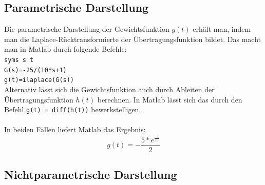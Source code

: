 
\subsection{Parametrische Darstellung} %
Die parametrische Darstellung der Gewichtsfunktion $g(t)$ erhält man, indem man die Laplace-Rücktransformierte der Übertragungsfunktion bildet. Das macht man in Matlab durch folgende Befehle:\\
\hspace*{0.5cm}\texttt{syms s t}\\
\hspace*{0.5cm}\texttt{G(s)=-25/(10*s+1)}\\
\hspace*{0.5cm}\texttt{g(t)=ilaplace(G(s))}\\
Alternativ lässt sich die Gewichtsfunktion auch durch Ableiten der Übertragungsfunktion $h(t)$ berechnen. In Matlab lässt sich das durch den Befehl \texttt{g(t) = diff(h(t))} bewerkstelligen.\\\\
In beiden Fällen liefert Matlab das Ergebnis:
\begin{equation*}
    g(t)=-\frac{5*e^{\frac{-t}{10}}}{2}
\end{equation*}

\subsection{Nichtparametrische Darstellung}
